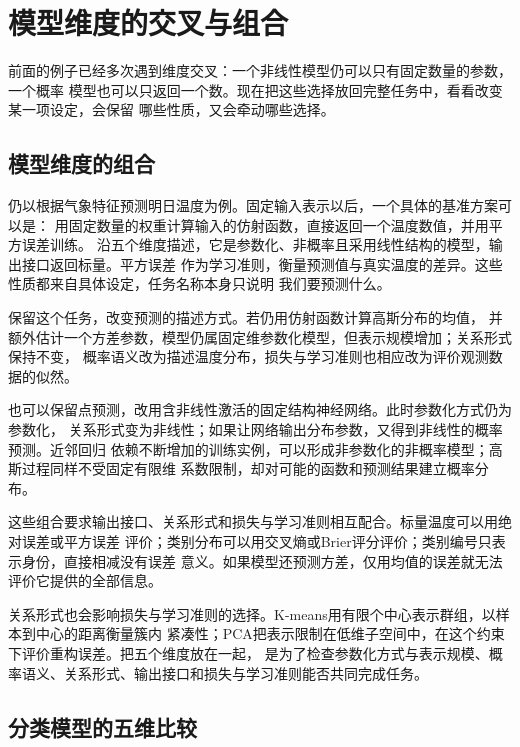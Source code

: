 \FloatBarrier
\section{模型维度的交叉与组合}
\label{sec:models-crossing}

前面的例子已经多次遇到维度交叉：一个非线性模型仍可以只有固定数量的参数，一个概率
模型也可以只返回一个数。现在把这些选择放回完整任务中，看看改变某一项设定，会保留
哪些性质，又会牵动哪些选择。

\subsection{模型维度的组合}
\label{sec:models-dimension-combination}

仍以根据气象特征预测明日温度为例。固定输入表示以后，一个具体的基准方案可以是：
用固定数量的权重计算输入的仿射函数，直接返回一个温度数值，并用平方误差训练。
沿五个维度描述，它是参数化、非概率且采用线性结构的模型，输出接口返回标量。平方误差
作为学习准则，衡量预测值与真实温度的差异。这些性质都来自具体设定，任务名称本身只说明
我们要预测什么。

保留这个任务，改变预测的描述方式。若仍用仿射函数计算高斯分布的均值，
并额外估计一个方差参数，模型仍属固定维参数化模型，但表示规模增加；关系形式保持不变，
概率语义改为描述温度分布，损失与学习准则也相应改为评价观测数据的似然。

也可以保留点预测，改用含非线性激活的固定结构神经网络。此时参数化方式仍为参数化，
关系形式变为非线性；如果让网络输出分布参数，又得到非线性的概率预测。近邻回归
依赖不断增加的训练实例，可以形成非参数化的非概率模型；高斯过程同样不受固定有限维
系数限制，却对可能的函数和预测结果建立概率分布。

这些组合要求输出接口、关系形式和损失与学习准则相互配合。标量温度可以用绝对误差或平方误差
评价；类别分布可以用交叉熵或Brier评分评价；类别编号只表示身份，直接相减没有误差
意义。如果模型还预测方差，仅用均值的误差就无法评价它提供的全部信息。

关系形式也会影响损失与学习准则的选择。K-means用有限个中心表示群组，以样本到中心的距离衡量簇内
紧凑性；PCA把表示限制在低维子空间中，在这个约束下评价重构误差。把五个维度放在一起，
是为了检查参数化方式与表示规模、概率语义、关系形式、输出接口和损失与学习准则能否共同完成任务。

\subsection{分类模型的五维比较}
\label{sec:models-classification-grid}

